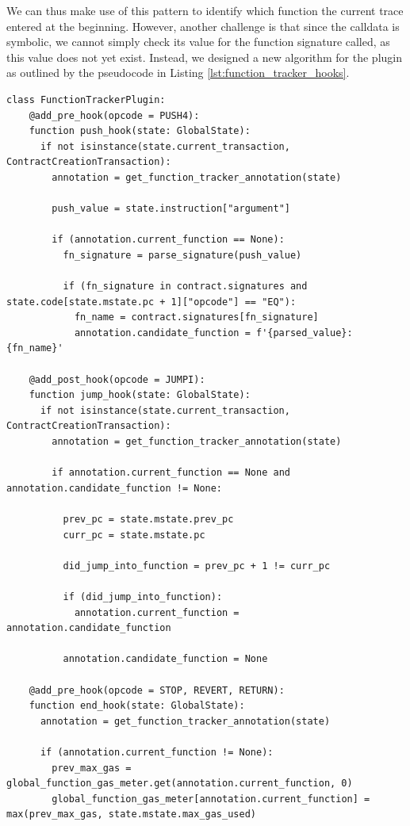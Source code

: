 We can thus make use of this pattern to identify which function the current trace entered
at the beginning. However, another challenge is that since the calldata is symbolic, 
we cannot simply check its value for the function signature called, 
as this value does not yet exist. Instead, we designed a new
algorithm for the plugin as outlined by the pseudocode in Listing \ref{lst:function_tracker_hooks}.


\begin{lstlisting}[language=Pseudocode, caption={Hooks implemented for function tracker plugin}, label={lst:function_tracker_hooks}, basicstyle=\ttfamily\scriptsize]
  class FunctionTrackerPlugin:
    @add_pre_hook(opcode = PUSH4):
    function push_hook(state: GlobalState):
      if not isinstance(state.current_transaction, ContractCreationTransaction):
        annotation = get_function_tracker_annotation(state)
        
        push_value = state.instruction["argument"]
        
        if (annotation.current_function == None):
          fn_signature = parse_signature(push_value)
      
          if (fn_signature in contract.signatures and state.code[state.mstate.pc + 1]["opcode"] == "EQ"):
            fn_name = contract.signatures[fn_signature]
            annotation.candidate_function = f'{parsed_value}:{fn_name}'
  
    @add_post_hook(opcode = JUMPI):
    function jump_hook(state: GlobalState):
      if not isinstance(state.current_transaction, ContractCreationTransaction):
        annotation = get_function_tracker_annotation(state)

        if annotation.current_function == None and annotation.candidate_function != None:
          
          prev_pc = state.mstate.prev_pc
          curr_pc = state.mstate.pc
          
          did_jump_into_function = prev_pc + 1 != curr_pc
          
          if (did_jump_into_function):
            annotation.current_function = annotation.candidate_function
          
          annotation.candidate_function = None

    @add_pre_hook(opcode = STOP, REVERT, RETURN):
    function end_hook(state: GlobalState):
      annotation = get_function_tracker_annotation(state)
              
      if (annotation.current_function != None):
        prev_max_gas = global_function_gas_meter.get(annotation.current_function, 0)
        global_function_gas_meter[annotation.current_function] = max(prev_max_gas, state.mstate.max_gas_used)
  \end{lstlisting}

